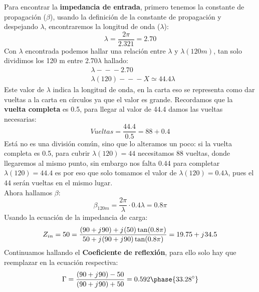 \documentclass[
	12pt, %
	fleqn, %
	a4paper, %
]{LegrandOrangeBook}
\begin{document}
\newpage
\begin{example}[Una línea de transmisión sin pérdidas tiene una $Z_0=50\Omega$ y una constante de fase de 2.321 rad/m, si la longitud de línea es de 120m y opera a 90MHz con una impedancia de carga $Z_L=90+\iu 90$. Encontrar: Impedancia de entrada, coeficiente de reflexión, SWR, perdida por retorno y potencia relativa.]\label{exe:1}
Para encontrar la \textbf{impedancia de entrada}, primero tenemos la constante de propagación ($\beta$), usando la definición de la constante de propagación y despejando $\lambda$, encontraremos la longitud de onda ($\lambda$):
\begin{displaymath}
\lambda=\frac{2\pi}{2.321}=2.70
\end{displaymath}
Con $\lambda$ encontrada podemos hallar una relación entre $\lambda$ y $\lambda(120m)$, tan solo dividimos los 120 m entre 2.70$\lambda$ hallado:
\begin{align*}
& \lambda -\!\!\!-\!\!\!- 2.70\\
& \lambda(120) -\!\!\!-\!\!\!- X\simeq 44.4\lambda
\end{align*}
Este valor de $\lambda$ indica la longitud de onda, en la carta eso se representa como dar vueltas a la carta en círculos ya que el valor es grande. Recordamos que la \textbf{vuelta completa} es 0.5, para llegar al valor de 44.4 damos las vueltas necesarias:
\begin{displaymath}
Vueltas=\frac{44.4}{0.5}=88+0.4
\end{displaymath}
Está no es una división común, sino que lo alteramos un poco: si la vuelta completa es 0.5, para cubrir $\lambda(120)=44$ necesitamos 88 vueltas, donde llegaremos al mismo punto, sin embargo nos falta 0.44 para completar $\lambda(120)=44.4$ es por eso que solo tomamos el valor de $\lambda(120)=0.4\lambda$, pues el 44 serán vueltas en el mismo lugar.\\
Ahora hallamos $\beta$:
\begin{displaymath}
\beta_{120m}=\frac{2\pi}{\lambda}\cdot 0.4\lambda=0.8\pi
\end{displaymath}
Usando la ecuación de la impedancia de carga:
\begin{displaymath}
Z_{in}=50=\frac{(90+{j\mkern1mu} 90)+{j\mkern1mu}(50)\tan(0.8\pi)}{50+{j\mkern1mu}(90+{j\mkern1mu} 90)\tan(0.8\pi)}=19.75+{j\mkern1mu}34.5
\end{displaymath}
Continuamos hallando el \textbf{Coeficiente de reflexión}, para ello solo hay que reemplazar en la ecuación respectiva:
\begin{displaymath}
\Gamma=\frac{(90+\iu 90)-50}{(90+\iu 90)+50}=0.592\phase{33.28^{\circ}}

\end{displaymath}
\end{example}
\end{document}
